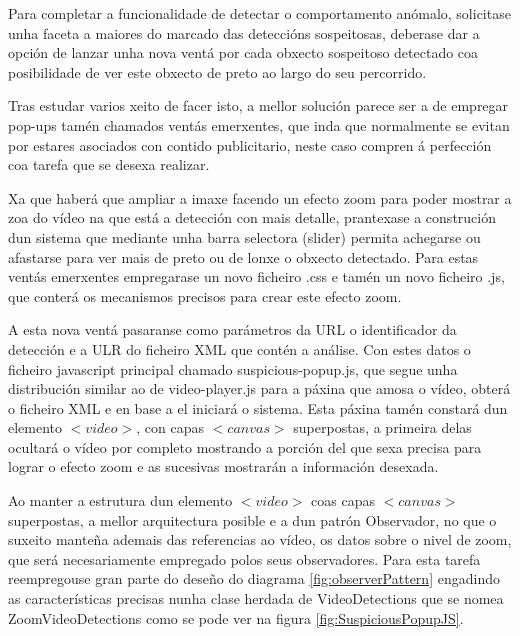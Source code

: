         Para completar a funcionalidade de detectar o comportamento anómalo, solicitase unha faceta a 
        maiores do marcado das deteccións sospeitosas, deberase dar a opción de lanzar unha nova ventá
        por cada obxecto sospeitoso detectado coa posibilidade de ver este obxecto de preto ao largo do
        seu percorrido.
        
        Tras estudar varios xeito de facer isto, a mellor solución parece ser a de empregar pop-ups 
        tamén chamados ventás emerxentes, que inda que normalmente se evitan por estares asociados 
        con contido publicitario, neste caso compren á perfección coa tarefa que se desexa realizar.
        
        Xa que haberá que ampliar a imaxe facendo un efecto zoom para poder mostrar a zoa do vídeo na
        que está a detección con mais detalle, prantexase a construción dun sistema que mediante unha
        barra selectora (slider) permita achegarse ou afastarse para ver mais de preto ou de lonxe o 
        obxecto detectado. Para estas ventás emerxentes empregarase un novo ficheiro .css e tamén un 
        novo ficheiro .js, que conterá os mecanismos precisos para crear este efecto zoom.
        
        A esta nova ventá pasaranse como parámetros da URL o identificador da detección e a ULR do 
        ficheiro XML que contén a análise. Con estes datos o ficheiro javascript principal chamado
        suspicious-popup.js, que segue unha distribución similar ao de video-player.js para a páxina
        que amosa o vídeo, obterá o ficheiro XML e en base a el iniciará o sistema. Esta
        páxina tamén constará dun elemento $<video>$, con capas $<canvas>$ superpostas, a primeira delas 
        ocultará o vídeo por completo mostrando a porción del que sexa precisa para lograr o efecto 
        zoom e as sucesivas mostrarán a información desexada.
        
        Ao manter a estrutura dun elemento $<video>$ coas capas $<canvas>$ superpostas, a mellor 
        arquitectura posible e a dun patrón Observador, no que o suxeito manteña ademais das referencias
        ao vídeo, os datos sobre o nivel de zoom, que será necesariamente empregado polos seus 
        observadores. Para esta tarefa reempregouse gran parte do deseño do diagrama \ref{fig:observerPattern}
        engadindo as características precisas nunha clase herdada de VideoDetections que se nomea 
        ZoomVideoDetections como se pode ver na figura \ref{fig:SuspiciousPopupJS}.
        
